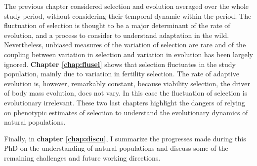 The previous chapter considered selection and evolution averaged over the whole study period, without considering their temporal dynamic within the period. The fluctuation of selection is thought to be a major determinant of the rate of evolution, and a process to consider to understand adaptation in the wild. 
Nevertheless, unbiased measures of the variation of selection are rare and of the coupling between variation in selection and variation in evolution has been largely ignored. \textbf{Chapter \ref{chap:flusel}} shows that selection fluctuates in the study population, mainly due to variation in fertility selection. The rate of adaptive evolution is, however, remarkably constant, because viability selection, the driver of body mass evolution, does not vary. In this case the fluctuation of selection is evolutionary irrelevant. These two last chapters highlight the dangers of relying on phenotypic estimates of selection to understand the evolutionary dynamics of natural populations.

Finally, in \textbf{chapter \ref{chap:discu}}, I summarize the progresses made during this PhD on the understanding of natural populations and discuss some of the remaining challenges and future working directions.

\printbibliography[heading=subbibliography]

